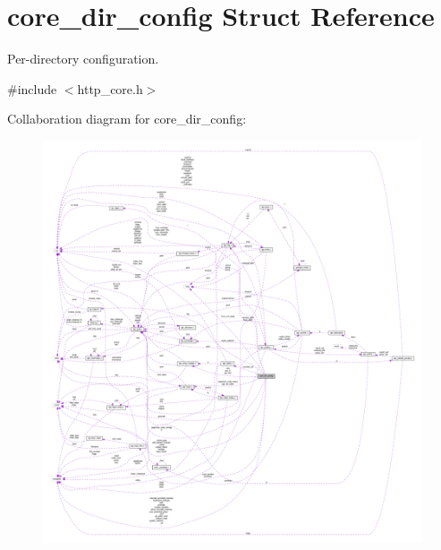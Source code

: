 \hypertarget{structcore__dir__config}{}\section{core\+\_\+dir\+\_\+config Struct Reference}
\label{structcore__dir__config}


Per-\/directory configuration.  




{\ttfamily \#include $<$http\+\_\+core.\+h$>$}



Collaboration diagram for core\+\_\+dir\+\_\+config\+:
\nopagebreak
\begin{figure}[H]
\begin{center}
\leavevmode
\includegraphics[width=350pt]{structcore__dir__config__coll__graph}
\end{center}
\end{figure}
